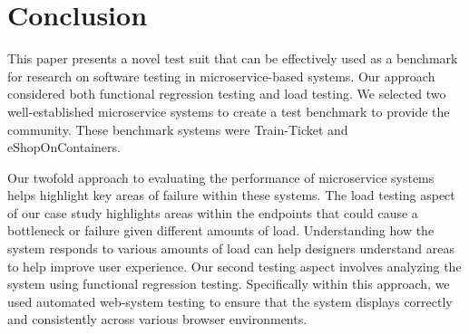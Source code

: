 



\section{Conclusion}
\label{sec:conclusion}

This paper presents a novel test suit that can be effectively used as a benchmark for research on software testing in microservice-based systems. Our approach considered both functional regression testing and load testing. We selected two well-established microservice systems to create a test benchmark to provide the community. These benchmark systems were Train-Ticket and eShopOnContainers.

Our twofold approach to evaluating the performance of microservice systems helps highlight key areas of failure within these systems. The load testing aspect of our case study highlights areas within the endpoints that could cause a bottleneck or failure given different amounts of load. Understanding how the system responds to various amounts of load can help designers understand areas to help improve user experience. Our second testing aspect involves analyzing the system using functional regression testing. Specifically within this approach, we used automated web-system testing to ensure that the system displays correctly and consistently across various browser environments.

